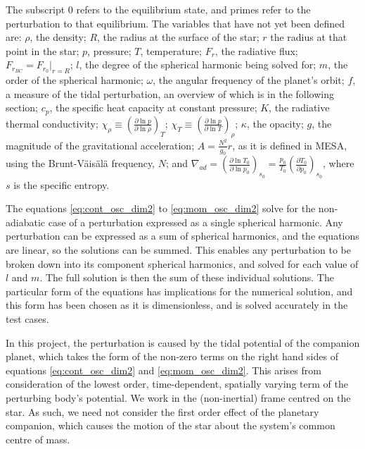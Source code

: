 \documentclass[11pt]{amsart}
\begin{document}
The subscript $0$ refers to the equilibrium state, and primes refer to the perturbation to that equilibrium.  The variables that have not yet been defined are: $\rho$, the density; $R$, the radius at the surface of the star; $r$ the radius at that point in the star; $p$, pressure; $T$, temperature; $F_{r}$, the radiative flux; $F_{r_{BC}} = F_{r_{0}} |_{r=R}$; $l$, the degree of the spherical harmonic being solved for; $m$, the order of the spherical harmonic; $\omega$, the angular frequency of the planet's orbit; $f$, a measure of the tidal perturbation, an overview of which is in the following section;  $c_{p}$, the specific heat capacity at constant pressure; $K$, the radiative thermal conductivity; $\chi_{\rho} \equiv \left( \frac{\partial \ln p}{\partial \ln \rho} \right)_{T}$; $\chi_{T} \equiv \left( \frac{\partial \ln p}{\partial \ln T} \right)_{\rho}$; $\kappa$, the opacity; $g$, the magnitude of the gravitational acceleration; $A = \frac{N^{2}}{g_{0}} r$, as it is defined in MESA, using the Brunt-V\"{a}is\"{a}l\"{a} frequency, $N$; and $\nabla_{ad} = \left( \frac{\partial \ln T_{0}}{\partial \ln p_{0}} \right)_{s_{0}} = \frac{p_{0}}{T_{0}} \left( \frac{\partial T_{0}}{\partial p_{0}} \right)_{s_{0}}$, where $s$ is the specific entropy.


The equations \ref{eq:cont_osc_dim2} to \ref{eq:mom_osc_dim2} solve for the non-adiabatic case of a perturbation expressed as a single spherical harmonic.  Any perturbation can be expressed as a sum of spherical harmonics, and the equations are linear, so the solutions can be summed.  This enables any perturbation to be broken down into its component spherical harmonics, and solved for each value of $l$ and $m$.  The full solution is then the sum of these individual solutions.  The particular form of the equations has implications for the numerical solution, and this form has been chosen as it is dimensionless, and is solved accurately in the test cases.

In this project, the perturbation is caused by the tidal potential of the companion planet, which takes the form of the non-zero terms on the right hand sides of equations \ref{eq:cont_osc_dim2} and \ref{eq:mom_osc_dim2}.  This arises from consideration of the lowest order, time-dependent, spatially varying term of the perturbing body's potential.  We work in the (non-inertial) frame centred on the star.  As such, we need not consider the first order effect of the planetary companion, which causes the motion of the star about the system's common centre of mass.
\end{document}
